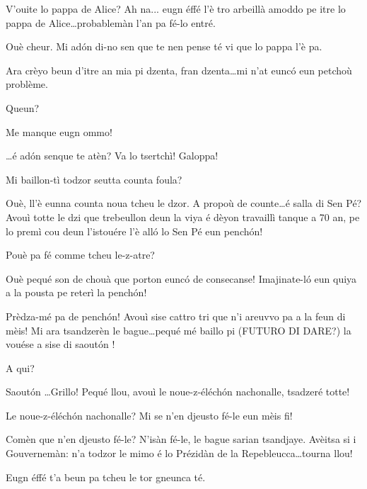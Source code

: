 \begin{drama}
\Guillaumespeaks{} V'ouite lo pappa de Alice? Ah na... eugn éffé l'è tro arbeillà amoddo pe itre lo pappa de Alice\ldots probablemàn l'an pa fé-lo entré.

\Cheriespeaks Ouè cheur.  Mi ad\'on di-no sen que te nen pense té vi que lo pappa l'è pa.

\Alicespeaks Ara crèyo beun d'itre an mia pi dzenta, fran dzenta\ldots mi n'at eunc\'o eun petchoù problème.

\Cheriespeaks Queun?

\Alicespeaks Me manque eugn ommo!

\Cheriespeaks \ldots é ad\'on senque te atèn? Va lo tsertchì! Galoppa!




  
\Vioujspeaks Mi baillon-tì todzor seutta counta foula?

\Vioupspeaks Ouè, ll'è eunna counta noua tcheu le dzor. A propoù de counte\ldots é salla di Sen Pé? Avouì totte le dzi que trebeullon deun la viya é dèyon travaillì tanque a 70 an, pe lo premì cou deun l'istouére l'è all\'o lo Sen Pé eun pench\'on!

\Vioujspeaks Pouè pa fé comme tcheu le-z-atre?

\Vioupspeaks Ouè pequé son de chouà que porton eunc\'o de consecanse! Imajinate-l\'o eun quiya a la pousta pe reterì la pench\'on! 

\Vioujspeaks Prèdza-mé pa de pench\'on! Avouì sise cattro tri que n'i areuvvo pa a la feun di mèis! Mi ara tsandzerèn le bague\ldots pequé mé baillo pi (FUTURO DI DARE?) la vouése a sise di saout\'on !

\Vioupspeaks A qui?

\Vioujspeaks Saout\'on \ldots Grillo! Pequé llou, avouì le noue-z-éléch\'on nachonalle, tsadzeré totte!

\Vioupspeaks Le noue-z-éléch\'on nachonalle? Mi se n'en djeusto fé-le eun mèis fi!

\Vioujspeaks Comèn que n'en djeusto fé-le? N'isàn fé-le, le bague sarian tsandjaye. Avèitsa si i Gouvernemàn: n'a todzor le mimo é lo Prézidàn de la Repebleucca\ldots tourna llou!

\Vioupspeaks Eugn éffé t'a beun pa tcheu le tor gneunca té.


\end{drama}
